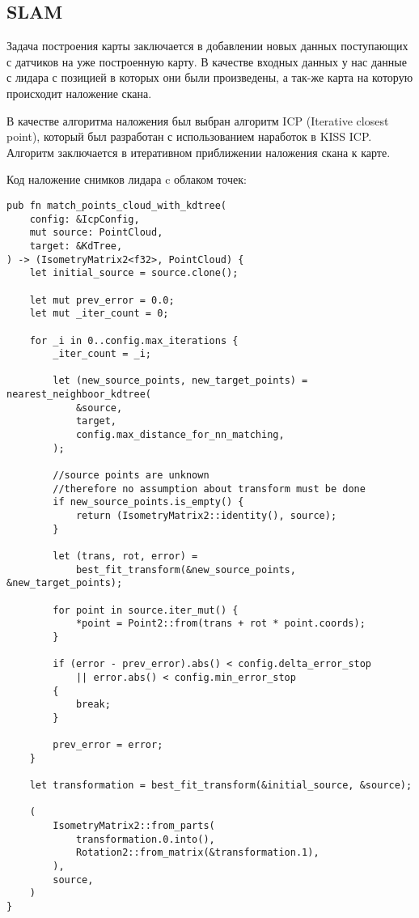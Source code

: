 \subsection{SLAM}
Задача построения карты заключается в добавлении новых данных поступающих с
датчиков на уже построенную карту. В качестве входных данных у нас данные с
лидара с позицией в которых они были произведены, а так-же карта на которую
происходит наложение скана.

В качестве алгоритма наложения был выбран алгоритм ICP (Iterative closest
point), который был разработан с использованием наработок в KISS ICP. Алгоритм
заключается в итеративном приближении наложения скана к карте.

Код наложение снимков лидара c облаком точек:
\begin{lstlisting}
pub fn match_points_cloud_with_kdtree(
    config: &IcpConfig,
    mut source: PointCloud,
    target: &KdTree,
) -> (IsometryMatrix2<f32>, PointCloud) {
    let initial_source = source.clone();

    let mut prev_error = 0.0;
    let mut _iter_count = 0;

    for _i in 0..config.max_iterations {
        _iter_count = _i;

        let (new_source_points, new_target_points) = nearest_neighboor_kdtree(
            &source,
            target,
            config.max_distance_for_nn_matching,
        );

        //source points are unknown
        //therefore no assumption about transform must be done
        if new_source_points.is_empty() {
            return (IsometryMatrix2::identity(), source);
        }

        let (trans, rot, error) =
            best_fit_transform(&new_source_points, &new_target_points);

        for point in source.iter_mut() {
            *point = Point2::from(trans + rot * point.coords);
        }

        if (error - prev_error).abs() < config.delta_error_stop
            || error.abs() < config.min_error_stop
        {
            break;
        }

        prev_error = error;
    }

    let transformation = best_fit_transform(&initial_source, &source);

    (
        IsometryMatrix2::from_parts(
            transformation.0.into(),
            Rotation2::from_matrix(&transformation.1),
        ),
        source,
    )
}
\end{lstlisting}

